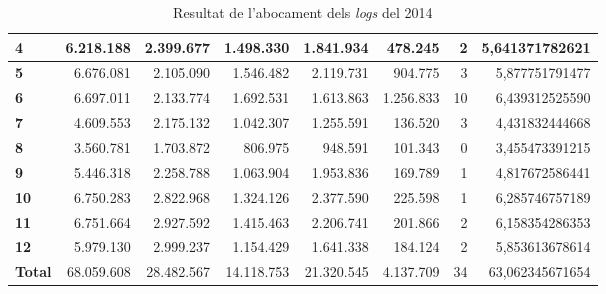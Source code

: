\begin{table}[h!]
\begin{adjustbox}{width=1.5\textwidth, center}
\begin{tabular}{|l|r|r|r|r|r|r|r|}
            \textbf{4}     & 6.218.188  & 2.399.677  & 1.498.330  & 1.841.934  & 478.245   & 2  & 5,641371782621  \\
            \midrule
            \textbf{5}     & 6.676.081  & 2.105.090  & 1.546.482  & 2.119.731  & 904.775   & 3  & 5,877751791477  \\
            \textbf{6}     & 6.697.011  & 2.133.774  & 1.692.531  & 1.613.863  & 1.256.833 & 10 & 6,439312525590  \\
            \textbf{7}     & 4.609.553  & 2.175.132  & 1.042.307  & 1.255.591  & 136.520   & 3  & 4,431832444668  \\
            \textbf{8}     & 3.560.781  & 1.703.872  & 806.975    & 948.591    & 101.343   & 0  & 3,455473391215  \\
            \midrule
            \textbf{9}     & 5.446.318  & 2.258.788  & 1.063.904  & 1.953.836  & 169.789   & 1  & 4,817672586441  \\
            \textbf{10}    & 6.750.283  & 2.822.968  & 1.324.126  & 2.377.590  & 225.598   & 1  & 6,285746757189  \\
            \textbf{11}    & 6.751.664  & 2.927.592  & 1.415.463  & 2.206.741  & 201.866   & 2  & 6,158354286353  \\
            \textbf{12}    & 5.979.130  & 2.999.237  & 1.154.429  & 1.641.338  & 184.124   & 2  & 5,853613678614  \\
            \midrule
            \textbf{Total} & 68.059.608 & 28.482.567 & 14.118.753 & 21.320.545 & 4.137.709 & 34 & 63,062345671654 \\            \bottomrule
        \end{tabular}
    \end{adjustbox}
    \caption{Resultat de l'abocament dels \textit{logs} del 2014}
    \label{tab:logs-table-2014}
\end{table}
